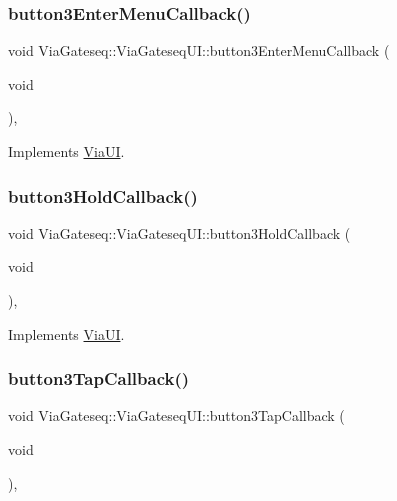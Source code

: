 \subsubsection{\texorpdfstring{button3\+Enter\+Menu\+Callback()}{button3EnterMenuCallback()}}
{\footnotesize\ttfamily void Via\+Gateseq\+::\+Via\+Gateseq\+U\+I\+::button3\+Enter\+Menu\+Callback (\begin{DoxyParamCaption}\item[{void}]{ }\end{DoxyParamCaption})\hspace{0.3cm}{\ttfamily [override]}, {\ttfamily [virtual]}}



Implements \mbox{\hyperlink{class_via_u_i_a883081e46324dec82ad89f2e77cf4b65}{Via\+UI}}.

\mbox{\label{class_via_gateseq_1_1_via_gateseq_u_i_a662b7cd49c71accc227fb74611e8aab2}} 
\subsubsection{\texorpdfstring{button3\+Hold\+Callback()}{button3HoldCallback()}}
{\footnotesize\ttfamily void Via\+Gateseq\+::\+Via\+Gateseq\+U\+I\+::button3\+Hold\+Callback (\begin{DoxyParamCaption}\item[{void}]{ }\end{DoxyParamCaption})\hspace{0.3cm}{\ttfamily [override]}, {\ttfamily [virtual]}}



Implements \mbox{\hyperlink{class_via_u_i_a7334aea36cf78afac284dd5e899e8ace}{Via\+UI}}.

\mbox{\label{class_via_gateseq_1_1_via_gateseq_u_i_abce5bbab2316b9c0bc3cfedbaaeeef73}} 
\subsubsection{\texorpdfstring{button3\+Tap\+Callback()}{button3TapCallback()}}
{\footnotesize\ttfamily void Via\+Gateseq\+::\+Via\+Gateseq\+U\+I\+::button3\+Tap\+Callback (\begin{DoxyParamCaption}\item[{void}]{ }\end{DoxyParamCaption})\hspace{0.3cm}{\ttfamily [override]}, {\ttfamily [virtual]}}



